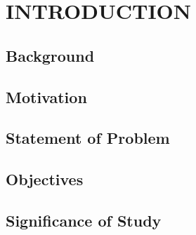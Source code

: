 \documentclass[main]{subfiles}
\begin{document}
\chapter{\MakeUppercase{INTRODUCTION}}


\section{Background}
\section{Motivation}
\section{Statement of Problem}
\section{Objectives}
\section{Significance of Study}
\end{document}
